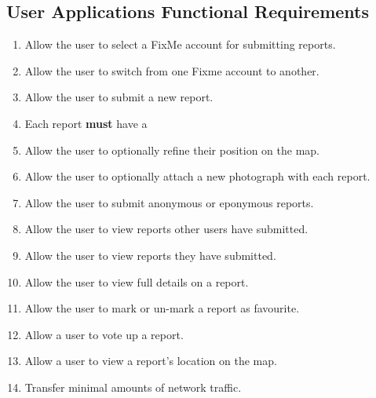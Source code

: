 \documentclass[12pt]{ecsproject}     %
\begin{document}
\subsection{User Applications Functional Requirements}
\begin{enumerate}
\item Allow the user to select a FixMe account for submitting reports.
\item Allow the user to switch from one Fixme account to another.
\item Allow the user to submit a new report.
\item Each report \textbf{must} have a 
\item Allow the user to optionally refine their position on the map.
\item Allow the user to optionally attach a new photograph with each report.
\item Allow the user to submit anonymous or eponymous reports.
\item Allow the user to view reports other users have submitted.
\item Allow the user to view reports they have submitted.
\item Allow the user to view full details on a report.
\item Allow the user to mark or un-mark a report as favourite.
\item Allow a user to vote up a report.
\item Allow a user to view a report's location on the map.
\item Transfer minimal amounts of network traffic.
\end{enumerate}
\end{document}
